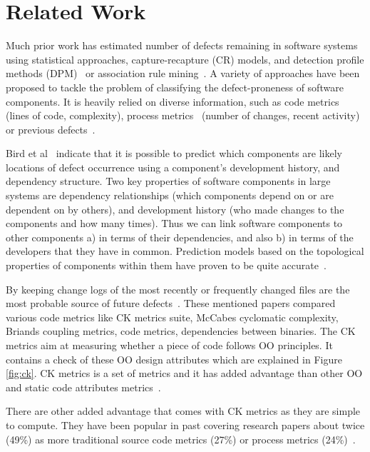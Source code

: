 \documentclass[sigconf]{acmart}
\theoremstyle{break}
\begin{document}
\section{Related Work}
\label{sect:review}

Much prior work has estimated number of defects remaining in software systems~\cite{hall2012systematic} using statistical approaches, capture-recapture (CR) models, and detection profile methods (DPM)~\cite{song2011general} or
association rule mining~\cite{song2006software}. A variety of approaches have been proposed to tackle the problem of classifying the defect-proneness of software components. It is heavily relied on diverse information, such as code metrics~\cite{d2010extensive,menzies2007data, nagappan2006mining,shepperd2014researcher,Menzies2010} (lines of code, complexity), process metrics~\cite{hassan2009predicting} (number of changes, recent activity) or previous defects~\cite{kim2007predicting}.

Bird et al~\cite{bird2009putting} indicate that it is possible to predict which components are likely locations of
defect occurrence using a component's development history,
and dependency structure. Two key properties of software components
in large systems are dependency relationships (which components
depend on or are dependent on by others), and development
history (who made changes to the components and
how many times). Thus we can link software components
to other components a) in terms of their dependencies, and
also b) in terms of the developers that they have in common. Prediction models based on the topological properties
of components within them have proven to be quite
accurate~\cite{zimmermann2008predicting}.

By keeping change logs of the most recently or frequently changed files are the most probable source of future defects~\cite{hall2012systematic, catal2009systematic}. These mentioned papers compared various code metrics like CK  metrics  suite,  McCabes  cyclomatic  complexity, Briands coupling metrics, code metrics, dependencies between  binaries. The CK metrics aim at measuring whether a piece of code follows OO principles. It contains a check of these OO design attributes which are explained in Figure \ref{fig:ck}. CK metrics is a set of metrics and it has added advantage than other OO and static code attributes metrics~\cite{d2010extensive}. 

There are other added advantage that comes with CK metrics as they are  simple  to  compute. They have been popular in past covering research papers about twice (49\%) as more traditional source code metrics (27\%) or process metrics (24\%)~\cite{radjenovic2013software}. 
\end{document}
